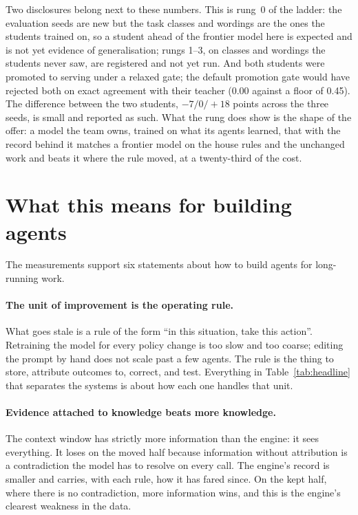 \documentclass[11pt]{article}
\begin{document}
Two disclosures belong next to these numbers. This is rung~0 of the ladder: the evaluation seeds
are new but the task classes and wordings are the ones the students trained on, so a student
ahead of the frontier model here is expected and is not yet evidence of generalisation; rungs
1--3, on classes and wordings the students never saw, are registered and not yet run. And both
students were promoted to serving under a relaxed gate; the default promotion gate would have
rejected both on exact agreement with their teacher (0.00 against a floor of 0.45). The difference between the two students, $-7/0/{+}18$ points across the three seeds, is
small and reported as such. What the rung does show is the shape of the offer: a model the team
owns, trained on what its agents learned, that with the record behind it matches a frontier
model on the house rules and the unchanged work and beats it where the rule moved, at a
twenty-third of the cost.

\section{What this means for building agents}
\label{sec:implications}

The measurements support six statements about how to build agents for long-running work.

\paragraph{The unit of improvement is the operating rule.}
What goes stale is a rule of the form ``in this situation, take this action''. Retraining the
model for every policy change is too slow and too coarse; editing the prompt by hand does not
scale past a few agents. The rule is the thing to store, attribute outcomes to, correct, and
test. Everything in Table~\ref{tab:headline} that separates the systems is about how each one
handles that unit.

\paragraph{Evidence attached to knowledge beats more knowledge.} The context window has strictly
more information than the engine: it sees everything. It loses on the moved half because
information without attribution is a contradiction the model has to resolve on every call. The
engine's record is smaller and carries, with each rule, how it has fared since. On the kept half,
where there is no contradiction, more information wins, and this is the engine's clearest
weakness in the data.
\end{document}
